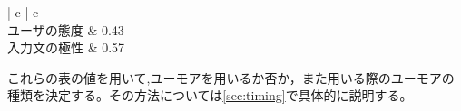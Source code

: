 \begin{table}[tb]
\begin{center}
\caption{正規化された重みづけ}
\label{tb:weight}
\begin{tabular}{| c | c |}
\hline
      \\\hline
	 ユーザの態度 & 0.43 \\\hline
     入力文の極性 & 0.57 \\\hline
     
\end{tabular}
\end{center}
\end{table}


これらの表の値を用いて,ユーモアを用いるか否か，また用いる際のユーモアの種類を決定する。その方法については\ref{sec:timing}で具体的に説明する。
